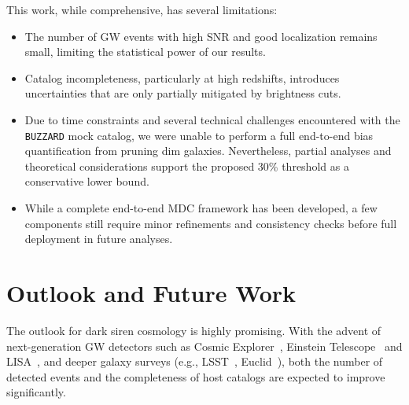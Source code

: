 This work, while comprehensive, has several limitations:
\vspace{-1em}
\begin{itemize}
    \item The number of \ac{GW} events with high \ac{SNR} and good localization remains small, limiting the statistical power of our results.
    \vspace{-1em}
    \item Catalog incompleteness, particularly at high redshifts, introduces uncertainties that are only partially mitigated by brightness cuts.
    \vspace{-1em}
    \item Due to time constraints and several technical challenges encountered with the \texttt{BUZZARD} mock catalog, we were unable to perform a full end-to-end bias quantification from pruning dim galaxies. Nevertheless, partial analyses and theoretical considerations support the proposed 30\% threshold as a conservative lower bound.
    \vspace{-1em}
    \item While a complete end-to-end \acf{MDC} framework has been developed, a few components still require minor refinements and consistency checks before full deployment in future analyses.
\end{itemize}

\section{Outlook and Future Work}

The outlook for dark siren cosmology is highly promising. With the advent of next-generation \ac{GW} detectors such as Cosmic Explorer~\citep{Evans:CE}, Einstein Telescope~\citep{Abac:ET} and LISA~\citep{LISA:2024hlh}, and deeper galaxy surveys (e.g., LSST~\citep{ivezic2019lsst}, Euclid~\citep{mellier2024euclid}), both the number of detected events and the completeness of host catalogs are expected to improve significantly.

